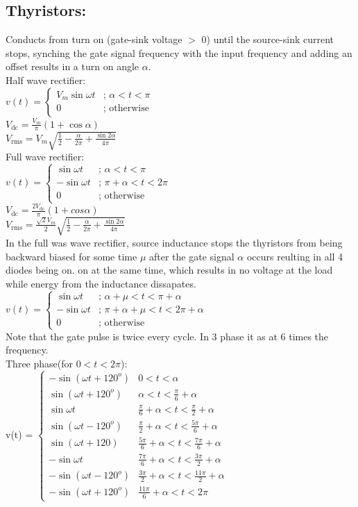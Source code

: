 \documentclass[10pt,landscape,a4paper]{article}
\newcommand{\subs}[1]{\ensuremath{_{\text{#1}}}}
\newcommand{\rms}{\subs{rms}}
\newcommand{\half}{\frac{1}{2}}
\newcommand{\rangedeftwo}[4]
{\ensuremath{
	\left\{
	\begin{array}{ll}
		#1 & \text{; } #2 \\
		#3 & \text{; } #4	
	\end{array}
	\right.
}}
\newcommand{\rangedefthree}[6]
{\ensuremath{
		\left\{
		\begin{array}{ll}
			#1 & \text{; } #2 \\
			#3 & \text{; } #4 \\
			#5 & \text{; } #6
		\end{array}
		\right.
	}
}
\begin{document}
\begin{multicols*}{4}
		\section{Thyristors:}
		Conducts from turn on (gate-sink voltage $ > $ 0) until the source-sink current stops, synching the gate signal frequency with the input frequency and adding an offset results in a turn on angle $ \alpha $.\\
		Half wave rectifier:\\
		$ v(t) = \rangedeftwo{V_m\sin\omega t}{\alpha<t<\pi}{0}{\text{otherwise}} $\\
		$ V\subs{dc} = \frac{V_m}{\pi}(1+\cos\alpha) $\\
		$ V\rms = V_m\sqrt{\half- \frac{\alpha}{2\pi}+\frac{\sin 2\alpha}{4\pi}} $\\
		Full wave rectifier:\\
		$ v(t) = \rangedefthree	{\sin\omega t}{\alpha<t<\pi}{-\sin\omega t}{\pi+\alpha<t<2\pi}{0}{\text{otherwise}} $\\
		$ V\subs{dc} = \frac{2V\subs{dc}}{\pi} (1+cos\alpha) $\\
		$ V\rms = \frac{\sqrt{2} V_m}{2} \sqrt{\half-\frac{\alpha}{2\pi}+\frac{\sin 2\alpha}{4\pi}} $\\
		In the full was wave rectifier, source inductance stops the thyristors from being backward biased for some time $ \mu $ after the gate signal $ \alpha $ occurs reulting in all 4 diodes being on. on at the same time, which results in no voltage at the load while energy from the inductance dissapates.\\
		$ v(t) = \rangedefthree{\sin\omega t}{\alpha+\mu<t<\pi+\alpha}{-\sin\omega t}{\pi+\alpha+\mu<t<2\pi+\alpha}{0}{\text{otherwise}} $\\
		Note that the gate pulse is twice every cycle. In 3 phase it as at 6 times the frequency.\\
		Three phase(for $ 0<t<2\pi $):\\
		v(t) = $ \left\{
		\begin{array}{ll}
		-\sin(\omega t+120^o) & 0<t<\alpha \\
		\sin(\omega t+120^o) & \alpha<t<\frac{\pi}{6}+\alpha \\
		\sin\omega t & \frac{\pi}{6}+\alpha<t<\frac{\pi}{2}+\alpha \\
		\sin(\omega t-120^o) & \frac{\pi}{2}+\alpha<t<\frac{5\pi}{6}+\alpha \\
		\sin(\omega t+120) & \frac{5\pi}{6}+\alpha<t<\frac{7\pi}{6}+\alpha \\
		-\sin\omega t & \frac{7\pi}{6}+\alpha<t<\frac{3\pi}{2}+\alpha \\
		-\sin(\omega t-120^o) & \frac{3\pi}{2}+\alpha<t<\frac{11\pi}{2}+\alpha \\
		-\sin(\omega t+120^o) & \frac{11\pi}{6}+\alpha<t<2\pi
		\end{array}
		\right.  $

\end{multicols*}
\end{document}
